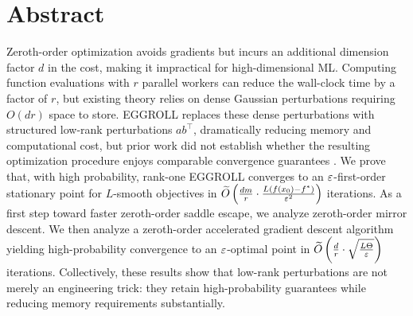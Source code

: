 
\chapter*{Abstract}

Zeroth-order optimization avoids gradients but incurs an additional dimension factor $d$ in the cost, making it impractical for high-dimensional ML. Computing function evaluations with $r$ parallel workers can reduce the wall-clock time by a factor of $r$, but existing theory relies on dense Gaussian perturbations requiring $O(dr)$ space to store. EGGROLL replaces these dense perturbations with structured low-rank perturbations $ab^\top$, dramatically reducing memory and computational cost, but prior work did not establish whether the resulting optimization procedure enjoys comparable convergence guarantees \citep{sarkar2025evolution}. We prove that, with high probability, rank-one EGGROLL converges to an $\varepsilon$-first-order stationary point for $L$-smooth objectives in $\widetilde{O}\left(\frac{dm}{r}\cdot\frac{L(f(x_0)-f^*)}{\varepsilon^2}\right)$ iterations. As a first step toward faster zeroth-order saddle escape, we analyze zeroth-order mirror descent. We then analyze a zeroth-order accelerated gradient descent algorithm yielding high-probability convergence to an $\varepsilon$-optimal point in $\widetilde{O}\left(\frac{d}{r} \cdot \sqrt{\frac{L\Theta}{\varepsilon}}\right)$ iterations. Collectively, these results show that low-rank perturbations are not merely an engineering trick: they retain high-probability guarantees while reducing memory requirements substantially.